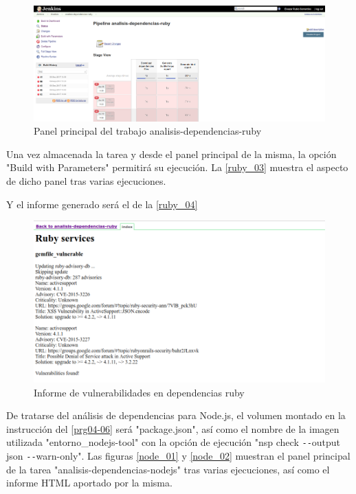 \begin{figure}[htbp]
	\centering
	\includegraphics[width=0.90\linewidth]
	{desarrollo/figuras/ruby_03.png}
	\caption{Panel principal del trabajo analisis-dependencias-ruby}
	\label{ruby_03}
\end{figure}

Una vez almacenada la tarea y desde el panel principal de la misma, la opción "Build with Parameters" permitirá su ejecución. La \autoref{ruby_03} muestra el aspecto de dicho panel tras varias ejecuciones.

Y el informe generado será el de la \autoref{ruby_04}

\begin{figure}[H]
	\centering
	\includegraphics[width=0.90\linewidth]
	{desarrollo/figuras/ruby_04.png}
	\caption{Informe de vulnerabilidades en dependencias ruby}
	\label{ruby_04}
\end{figure}

De tratarse del análisis de dependencias para Node.js, el volumen montado en la instrucción del \autoref{prg04-06} será "package.json", así como el nombre de la imagen utilizada "entorno\_nodejs-tool" con la opción de ejecución "nsp check \texttt{-{}-}output json \texttt{-{}-}warn-only". Las figuras \ref{node_01} y \ref{node_02} muestran el panel principal de la tarea "analisis-dependencias-nodejs" tras varias ejecuciones, así como el informe HTML aportado por la misma.

